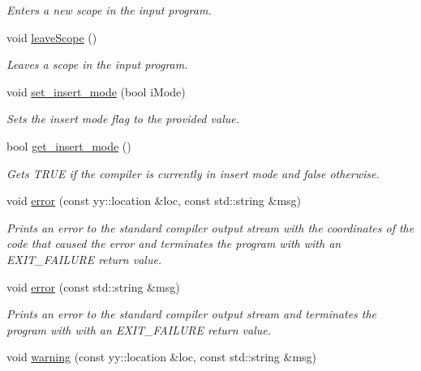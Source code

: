 \begin{DoxyCompactItemize}
\begin{DoxyCompactList}\small\item\em Enters a new scope in the input program. \end{DoxyCompactList}\item 
\hypertarget{classCCompiler_a2bccef2eb5e1f9a822ebca90f744ac2f}{void \hyperlink{classCCompiler_a2bccef2eb5e1f9a822ebca90f744ac2f}{leave\-Scope} ()}\label{classCCompiler_a2bccef2eb5e1f9a822ebca90f744ac2f}

\begin{DoxyCompactList}\small\item\em Leaves a scope in the input program. \end{DoxyCompactList}\item 
void \hyperlink{classCCompiler_a0517c73a064cdbd86b9d538464bf72fc}{set\-\_\-insert\-\_\-mode} (bool i\-Mode)
\begin{DoxyCompactList}\small\item\em Sets the insert mode flag to the provided value. \end{DoxyCompactList}\item 
bool \hyperlink{classCCompiler_a947d3b408eea7a9365b9d05f6f247142}{get\-\_\-insert\-\_\-mode} ()
\begin{DoxyCompactList}\small\item\em Gets T\-R\-U\-E if the compiler is currently in insert mode and false otherwise. \end{DoxyCompactList}\item 
void \hyperlink{classCCompiler_aeb15aaabe4c6eba50ae6448dc994d720}{error} (const yy\-::location \&loc, const std\-::string \&msg)
\begin{DoxyCompactList}\small\item\em Prints an error to the standard compiler output stream with the coordinates of the code that caused the error and terminates the program with with an E\-X\-I\-T\-\_\-\-F\-A\-I\-L\-U\-R\-E return value. \end{DoxyCompactList}\item 
void \hyperlink{classCCompiler_a42f25efb480223b1bf7a98606d57b8d4}{error} (const std\-::string \&msg)
\begin{DoxyCompactList}\small\item\em Prints an error to the standard compiler output stream and terminates the program with with an E\-X\-I\-T\-\_\-\-F\-A\-I\-L\-U\-R\-E return value. \end{DoxyCompactList}\item 
void \hyperlink{classCCompiler_a078454badd5c6ecb66c9b177bf8e45e2}{warning} (const yy\-::location \&loc, const std\-::string \&msg)

\end{DoxyCompactItemize}
